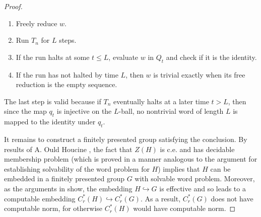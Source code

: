 \documentclass[10pt,a4paper]{amsart}
\theoremstyle{plain}
\theoremstyle{definition}
\numberwithin{equation}{section}
\begin{document}
\begin{proof}
\begin{enumerate}
    \item[(i)] Freely reduce $w$.
\item[(ii)] Run $T_n$ for $L$ steps.
\item[(iii)] If the run halts at some $t \leq L$, evaluate $w$ in $Q_t$ and check if it is the identity.
\item[(iv)] If the run has not halted by time $L$, then $w$ is trivial exactly when its free reduction is the empty sequence. 
\end{enumerate}

The last step is valid because if $T_n$ eventually halts at a later time $t>L$, then since the map $q_t$ is injective on the $L$-ball, no nontrivial word of length $L$ is mapped to the identity under $q_t$.

It remains to construct a finitely presented group satisfying the conclusion.  By results of A. Ould Houcine \cite[Theorems I and II]{ouldhoucine}, the fact that $Z(H)$ is c.e. and has decidable membership problem (which is proved in a manner analogous to the argument for establishing solvability of the word problem for $H$) implies that $H$ can be embedded in a finitely presented group $G$ with solvable word problem.  Moreover, as the arguments in \cite{ouldhoucine} show, the embedding $H\hookrightarrow G$ is effective and so leads to a computable embedding $C^*_r(H)\hookrightarrow C^*_r(G)$.  As a result, $C^*_r(G)$ does not have computable norm, for otherwise $C^*_r(H)$ would have computable norm.
\end{proof}
\end{document}
